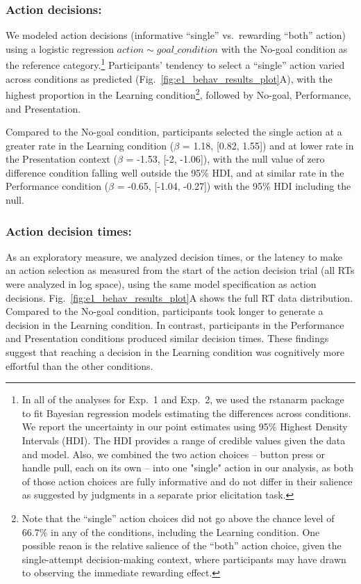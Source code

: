 \documentclass[10pt, letterpaper]{article}
\begin{document}
\subsubsection{Action decisions:}\label{action-decisions}

We modeled action decisions (informative ``single'' vs.~rewarding
``both'' action) using a logistic regression
\texttt{$action \sim goal\_condition$} with the No-goal condition as the
reference
category.\footnote{In all of the analyses for Exp.\ 1 and Exp.\ 2, we used the {\selectfont rstanarm} package to fit Bayesian regression models estimating the differences across conditions. We report the uncertainty in our point estimates using 95\% Highest Density Intervals (HDI). The HDI provides a range of credible values given the data and model. Also, we combined the two action choices  -- button press or handle pull, each on its own -- into one "single" action in our analysis, as both of those action choices are fully informative and do not differ in their salience as suggested by judgments in a separate prior elicitation task.}
Participants' tendency to select a ``single'' action varied across
conditions as predicted (Fig.~\ref{fig:e1_behav_results_plot}A), with
the highest proportion in the Learning condition\footnote{Note that the
  ``single'' action choices did not go above the chance level of 66.7\%
  in any of the conditions, including the Learning condition. One
  possible reaon is the relative salience of the ``both'' action choice,
  given the single-attempt decision-making context, where participants
  may have drawn to observing the immediate rewarding effect.}, followed
by No-goal, Performance, and Presentation.

Compared to the No-goal condition, participants selected the single
action at a greater rate in the Learning condition (\(\beta\) = 1.18,
{[}0.82, 1.55{]}) and at lower rate in the Presentation context
(\(\beta\) = -1.53, {[}-2, -1.06{]}), with the null value of zero
difference condition falling well outside the 95\% HDI, and at similar
rate in the Performance condition (\(\beta\) = -0.65, {[}-1.04,
-0.27{]}) with the 95\% HDI including the null.

\subsubsection{Action decision times:}\label{action-decision-times}

As an exploratory measure, we analyzed decision times, or the latency to
make an action selection as measured from the start of the action
decision trial (all RTs were analyzed in log space), using the same
model specification as action decisions.
Fig.~\ref{fig:e1_behav_results_plot}A shows the full RT data
distribution. Compared to the No-goal condition, participants took
longer to generate a decision in the Learning condition. In contrast,
participants in the Performance and Presentation conditions produced
similar decision times. These findings suggest that reaching a decision
in the Learning condition was cognitively more effortful than the other
conditions.
\end{document}
